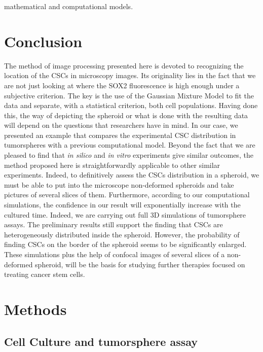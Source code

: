 \documentclass[fleqn,10pt]{wlscirep}
\begin{document}
mathematical and computational models.
     

\section*{Conclusion}

The method of image processing presented here is devoted to recognizing the location of the CSCs in microscopy images. Its originality lies in the fact that we are not just looking at where the SOX2 fluorescence is high enough under a subjective criterion. The key is the use of the Gaussian Mixture Model to fit the data and separate, with a statistical criterion, both cell populations. Having done this, the way of depicting the spheroid or what is done with the resulting data will depend on the questions that researchers have in mind. In our case, we presented an example that compares the experimental CSC distribution in tumorspheres with a previous computational model. Beyond the fact that we are pleased to find that \emph{in silico} and \emph{in vitro} experiments give similar outcomes, the method proposed here is straightforwardly applicable to other similar experiments. Indeed, to definitively assess the CSCs distribution in a spheroid, we must be able to put into the microscope non-deformed spheroids and take pictures of several slices of them.
Furthermore, according to our computational simulations, the confidence in our result will exponentially increase with the cultured time. Indeed, we are carrying out full 3D simulations of tumorsphere assays. The preliminary results still support the finding that CSCs are heterogeneously distributed inside the spheroid. However, the probability of finding CSCs on the border of the spheroid seems to be significantly enlarged. These simulations plus the help of confocal images of several slices of a non-deformed spheroid, will be the basis for studying further therapies focused on treating cancer stem cells. 
             
   



\section*{Methods} \label{s: methods}


\subsection*{Cell Culture and tumorsphere assay}
\end{document}
